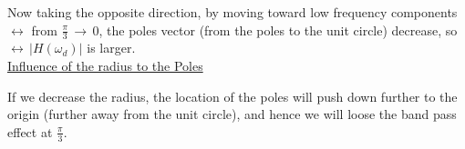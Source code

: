 \begin{enumerate}
Now taking the opposite direction, by moving toward low frequency components $\leftrightarrow$ from $ \displaystyle\frac{\pi}{3} \, \rightarrow \, 0$, the poles vector (from the poles to the unit circle) decrease, so $\leftrightarrow \, \lvert H(\omega_d) \rvert$ is larger.\\


\underline{Influence of the radius to the Poles}

If we decrease the radius, the location of the poles will push down further to the origin (further away from the unit circle), and hence we will loose the band pass effect at $\displaystyle\frac{\pi}{3}$.

    
    
    
\end{enumerate}